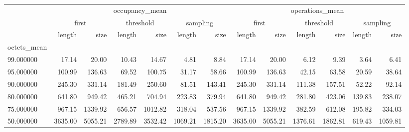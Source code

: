 \begin{tabular}{lrrrrrrrrrrrr}
\toprule
 & \multicolumn{6}{c}{occupancy_mean} & \multicolumn{6}{c}{operations_mean} \\
 & \multicolumn{2}{c}{first} & \multicolumn{2}{c}{threshold} & \multicolumn{2}{c}{sampling} & \multicolumn{2}{c}{first} & \multicolumn{2}{c}{threshold} & \multicolumn{2}{c}{sampling} \\
 & length & size & length & size & length & size & length & size & length & size & length & size \\
octets_mean &  &  &  &  &  &  &  &  &  &  &  &  \\
\midrule
99.000000 & 17.14 & 20.00 & 10.43 & 14.67 & 4.81 & 8.84 & 17.14 & 20.00 & 6.12 & 9.39 & 3.64 & 6.41 \\
95.000000 & 100.99 & 136.63 & 69.52 & 100.75 & 31.17 & 58.66 & 100.99 & 136.63 & 42.15 & 63.58 & 20.59 & 38.64 \\
90.000000 & 245.30 & 331.14 & 181.49 & 250.60 & 81.51 & 143.41 & 245.30 & 331.14 & 111.38 & 157.51 & 52.22 & 92.14 \\
80.000000 & 641.80 & 949.42 & 465.21 & 704.94 & 223.83 & 379.94 & 641.80 & 949.42 & 281.80 & 423.06 & 139.83 & 238.07 \\
75.000000 & 967.15 & 1339.92 & 656.57 & 1012.82 & 318.04 & 537.56 & 967.15 & 1339.92 & 382.59 & 612.08 & 195.82 & 334.03 \\
50.000000 & 3635.00 & 5055.21 & 2789.89 & 3532.42 & 1069.21 & 1815.20 & 3635.00 & 5055.21 & 1376.61 & 1862.81 & 619.43 & 1059.81 \\
\bottomrule
\end{tabular}
